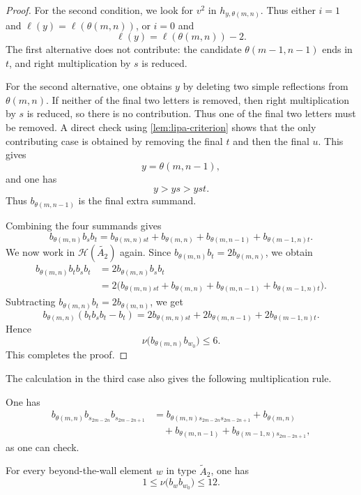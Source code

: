 \documentclass[a4paper,11pt]{amsart}
\newcommand{\Hecke}{\mc H}
\newcommand{\wt}{\widetilde}
\newcommand{\nuop}{\nu}
\newcommand{\mc}{\mathcal}
\numberwithin{equation}{subsection}
\theoremstyle{definition}
\theoremstyle{remark}
\begin{document}
\begin{proof}
For the second condition, we look for \(v^2\) in \(h_{y,\theta(m,n)}\). Thus
either \(i=1\) and \(\ell(y)=\ell(\theta(m,n))\), or \(i=0\) and
\[
\ell(y)=\ell(\theta(m,n))-2.
\]
The first alternative does not contribute: the candidate \(\theta(m-1,n-1)\)
ends in \(t\), and right multiplication by \(s\) is reduced.

For the second alternative, one obtains \(y\) by deleting two simple reflections
from \(\theta(m,n)\). If neither of the final two letters is removed, then right
multiplication by \(s\) is reduced, so there is no contribution. Thus one of the
final two letters must be removed. A direct check using
\autoref{lem:lipa-criterion} shows that the only contributing case is obtained
by removing the final \(t\) and then the final \(u\). This gives
\[
y=\theta(m,n-1),
\]
and one has
\[
y>ys>yst.
\]
Thus \(b_{\theta(m,n-1)}\) is the final extra summand.

Combining the four summands gives
\[
b_{\theta(m,n)}b_sb_t
=
b_{\theta(m,n)st}
+
b_{\theta(m,n)}
+
b_{\theta(m,n-1)}
+
b_{\theta(m-1,n)t}.
\]
We now work in $\Hecke(\widetilde{A_2})$ again. Since \(b_{\theta(m,n)}b_t=2b_{\theta(m,n)}\), we obtain
\[
\begin{aligned}
b_{\theta(m,n)}b_tb_sb_t
&=
2b_{\theta(m,n)}b_sb_t
\\
&=
2\bigl(
b_{\theta(m,n)st}
+
b_{\theta(m,n)}
+
b_{\theta(m,n-1)}
+
b_{\theta(m-1,n)t}
\bigr).
\end{aligned}
\]
Subtracting \(b_{\theta(m,n)}b_t=2b_{\theta(m,n)}\), we get
\[
b_{\theta(m,n)}(b_tb_sb_t-b_t)
=
2b_{\theta(m,n)st}
+
2b_{\theta(m,n-1)}
+
2b_{\theta(m-1,n)t}.
\]
Hence
\[
\nuop\bigl(b_{\theta(m,n)}b_{w_0}\bigr)\leq 6.
\]
This completes the proof.
\end{proof}

The calculation in the third case also gives the following multiplication rule.

\begin{Remark}\label{rem:extra-beyond-wall-rule}
One has
\[
\begin{aligned}
b_{\theta(m,n)}b_{s_{2m-2n}}b_{s_{2m-2n+1}}
&=
b_{\theta(m,n)s_{2m-2n}s_{2m-2n+1}}
+
b_{\theta(m,n)}
\\
&\quad
+
b_{\theta(m,n-1)}
+
b_{\theta(m-1,n)s_{2m-2n+1}},
\end{aligned}
\]
as one can check.
\end{Remark}

\begin{Lemma}\label{cor:beyond-wall-w0-bound}
For every beyond-the-wall element \(w\) in type \(\wt A_2\), one has
\[
1\leq \nuop\bigl(b_wb_{w_0}\bigr)\leq 12.
\]
\end{Lemma}
\end{document}

